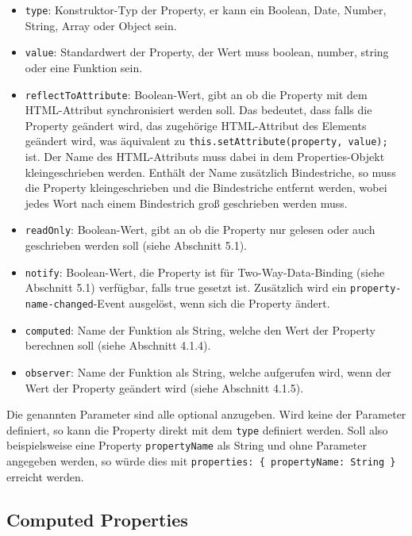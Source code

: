 

\begin{itemize}
\tightlist
\item
  \texttt{type}: Konstruktor-Typ der Property, er kann ein Boolean,
  Date, Number, String, Array oder Object sein.
\item
  \texttt{value}: Standardwert der Property, der Wert muss boolean,
  number, string oder eine Funktion sein.
\item
  \texttt{reflectToAttribute}: Boolean-Wert, gibt an ob die Property mit
  dem HTML-Attribut synchronisiert werden soll. Das bedeutet, dass falls
  die Property geändert wird, das zugehörige HTML-Attribut des Elements
  geändert wird, was äquivalent zu
  \texttt{this.setAttribute(property,\ value);} ist. Der Name des
  HTML-Attributs muss dabei in dem Properties-Objekt kleingeschrieben
  werden. Enthält der Name zusätzlich Bindestriche, so muss die Property
  kleingeschrieben und die Bindestriche entfernt werden, wobei jedes
  Wort nach einem Bindestrich groß geschrieben werden muss.
\item
  \texttt{readOnly}: Boolean-Wert, gibt an ob die Property nur gelesen
  oder auch geschrieben werden soll (siehe Abschnitt 5.1).
\item
  \texttt{notify}: Boolean-Wert, die Property ist für
  Two-Way-Data-Binding (siehe Abschnitt 5.1) verfügbar, falls true
  gesetzt ist. Zusätzlich wird ein \texttt{property-name-changed}-Event
  ausgelöst, wenn sich die Property ändert.
\item
  \texttt{computed}: Name der Funktion als String, welche den Wert der
  Property berechnen soll (siehe Abschnitt 4.1.4).
\item
  \texttt{observer}: Name der Funktion als String, welche aufgerufen
  wird, wenn der Wert der Property geändert wird (siehe Abschnitt
  4.1.5).
\end{itemize}

Die genannten Parameter sind alle optional anzugeben. Wird keine der
Parameter definiert, so kann die Property direkt mit dem \texttt{type}
definiert werden. Soll also beispielsweise eine Property
\texttt{propertyName} als String und ohne Parameter angegeben werden, so
würde dies mit \texttt{properties:\ \{\ propertyName:\ String\ \}}
erreicht werden.

\subsection{Computed Properties}\label{computed-properties}

